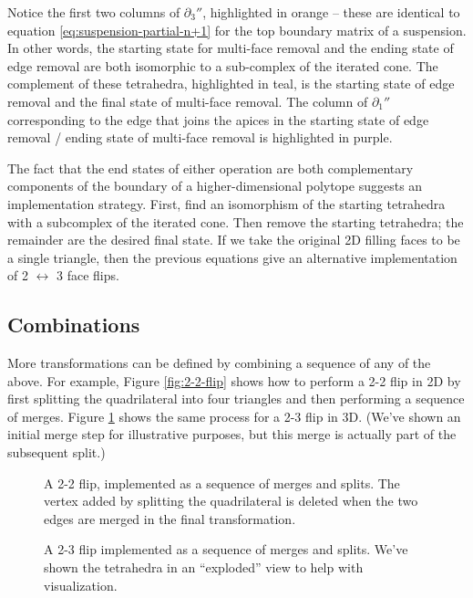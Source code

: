\documentclass[twocolumn]{article}
\begin{document}
Notice the first two columns of $\partial_3''$, highlighted in orange -- these are identical to equation \eqref{eq:suspension-partial-n+1} for the top boundary matrix of a suspension.
In other words, the starting state for multi-face removal and the ending state of edge removal are both isomorphic to a sub-complex of the iterated cone.
The complement of these tetrahedra, highlighted in teal, is the starting state of edge removal and the final state of multi-face removal.
The column of $\partial_1''$ corresponding to the edge that joins the apices in the starting state of edge removal / ending state of multi-face removal is highlighted in purple.

The fact that the end states of either operation are both complementary components of the boundary of a higher-dimensional polytope suggests an implementation strategy.
First, find an isomorphism of the starting tetrahedra with a subcomplex of the iterated cone.
Then remove the starting tetrahedra; the remainder are the desired final state.
If we take the original 2D filling faces to be a single triangle, then the previous equations give an alternative implementation of 2 $\leftrightarrow$ 3 face flips.

\subsection{Combinations}

More transformations can be defined by combining a sequence of any of the above.
For example, Figure \ref{fig:2-2-flip} shows how to perform a 2-2 flip in 2D by first splitting the quadrilateral into four triangles and then performing a sequence of merges.
Figure \ref{fig:2-3-flip} shows the same process for a 2-3 flip in 3D.
(We've shown an initial merge step for illustrative purposes, but this merge is actually part of the subsequent split.)

\begin{figure}[t]

    \begin{center}
        
    \end{center}
    \caption{A 2-2 flip, implemented as a sequence of merges and splits.
    The vertex added by splitting the quadrilateral is deleted when the two edges are merged in the final transformation.}
    \label{fig:2-2-flip}

    \begin{center}
        
    \end{center}
    \caption{A 2-3 flip implemented as a sequence of merges and splits.
    We've shown the tetrahedra in an ``exploded'' view to help with visualization.}
    \label{fig:2-3-flip}
\end{figure}
\end{document}
